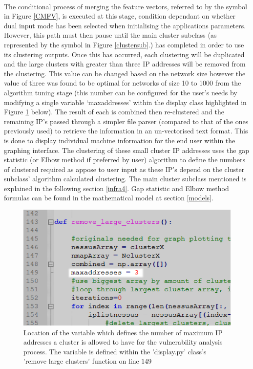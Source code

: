 \paragraph{}The conditional process of merging the feature vectors, referred to by the symbol in Figure \ref{CMFV}, is executed at this stage, condition dependant on whether dual input mode has been selected when initialising the applications parameters. However, this path must then pause until the main cluster subclass (as represented by the symbol in Figure \ref{clustersub}.) has completed in order to use its clustering outputs. Once this has occurred, each clustering will be duplicated and the large clusters with greater than three IP addresses will be removed from the clustering. This value can be changed based on the network size however the value of three was found to be optimal for networks of size 10 to 1000 from the algorithm tuning stage (this number can be configured for the user’s needs by modifying a single variable ‘maxaddresses’ within the display class highlighted in Figure \ref{ipno} below). The result of each is combined then re-clustered and the remaining IP’s passed through a simpler file parser (compared to that of the ones previously used) to retrieve the information in an un-vectorised text format. This is done to display individual machine information for the end user within the graphing interface. The clustering of these small cluster IP addresses uses the gap statistic (or Elbow method if preferred by user) algorithm to define the numbers of clustered required as appose to user input as these IP’s depend on the cluster subclass’ algorithm calculated clustering. The main cluster subclass mentioned is explained in the following section \ref{infra4}. Gap statistic and Elbow method formulas can be found in the mathematical model at section \ref{models}.

\begin{figure}[!h]
\centering
\includegraphics{./Figures/ipno.png}
\caption{Location of the variable which defines the number of maximum IP addresses a cluster is allowed to have for the vulnerability analysis process. The variable is defined within the 'display.py' class's 'remove large clusters' function on line 149}
\label{ipno}
\end{figure}


